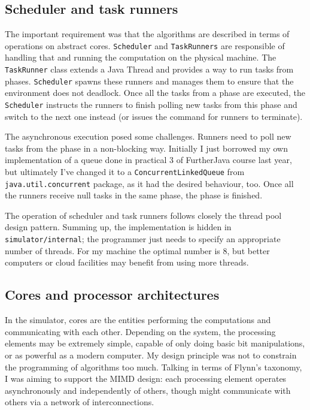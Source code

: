 \documentclass[12pt,a4paper,oneside,openright]{report}
\begin{document}
\subsection{Scheduler and task runners}
The important requirement was that the algorithms are described in terms of operations on abstract cores. \texttt{Scheduler} and \texttt{TaskRunners} are responsible of handling that and running the computation on the physical machine. The \texttt{TaskRunner} class extends a Java Thread and provides a way to run tasks from phases. \texttt{Scheduler} spawns these runners and manages them to ensure that the environment does not deadlock. Once all the tasks from a phase are executed, the \texttt{Scheduler} instructs the runners to finish polling new tasks from this phase and switch to the next one instead (or issues the command for runners to terminate).

The asynchronous execution posed some challenges. Runners need to poll new tasks from the phase in a non-blocking way. Initially I just borrowed my own implementation of a queue done in practical 3 of FurtherJava course last year, but ultimately I've changed it to a  \texttt{ConcurrentLinkedQueue} from \texttt{java.util.concurrent} package, as it had the desired behaviour, too. Once all the runners receive null tasks in the same phase, the phase is finished.

The operation of scheduler and task runners follows closely the thread pool design pattern. Summing up, the implementation is hidden in \texttt{simulator/internal}; the programmer just needs to specify an appropriate number of threads. For my machine the optimal number is $8$, but better computers or cloud facilities may benefit from using more threads. 

\subsection{Cores and processor architectures}
In the simulator, cores are the entities performing the computations and communicating with each other. Depending on the system, the processing elements may be extremely simple, capable of only doing basic bit manipulations, or as powerful as a modern computer. My design principle was not to constrain the programming of algorithms too much. Talking in terms of Flynn's taxonomy\cite{Flynn}, I was aiming to support the MIMD design: each processing element operates asynchronously and independently of others, though might communicate with others via a network of interconnections. 
\end{document}
